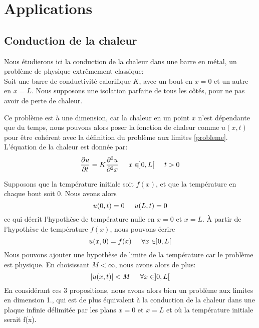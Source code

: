 \documentclass[12pt]{article}
\newcommand{\espace}{\hspace{5mm}}
\begin{document}
\section{Applications}

\subsection{Conduction de la chaleur}

Nous étudierons ici la conduction de la chaleur dans une barre en métal, un problème de physique extrêmement classique:\\
Soit une barre de conductivité calorifique $K$, avec un bout en $x = 0$ et un autre en $x = L$. Nous supposons une isolation parfaite de tous les côtés, pour ne pas avoir de perte de chaleur.

\begin{center}
\end{center}

Ce problème est à une dimension, car la chaleur en un point $x$ n'est dépendante que du temps, nous pouvons alors poser la fonction de chaleur comme $u(x,t)$ pour être cohérent avec la définition du problème aux limites \eqref{probleme}.
L'équation de la chaleur est donnée par:
\begin{equation} \label{equationChaleur}
\frac{\partial u}{\partial t} = K \frac{\partial^2 u}{\partial^2 x} \espace x \in]0,L[ \espace t>0
\end{equation}

Supposons que la température initiale soit $f(x)$, et que la température en chaque bout soit 0. Nous avons alors
\begin{equation} \label{temperaturesBouts}
u(0,t) = 0\espace u(L,t) = 0
\end{equation}
ce qui décrit l'hypothèse de température nulle en $x=0$ et $x=L$.  À partir de l'hypothèse de température $f(x)$, nous pouvons écrire
\begin{equation}
u(x,0) = f(x) \espace \forall x \in ]0,L[
\end{equation}
Nous pouvons ajouter une hypothèse de limite de la température car le problème est physique. En choisissant $M < \infty$, nous avons alors de plus:
\begin{equation}
|u(x,t)| < M \espace \forall x \in ]0,L[
\end{equation}
En considérant ces 3 propositions, nous avons alors bien un problème aux limites en dimension 1., qui est de plus équivalent à la conduction de la chaleur dans une plaque infinie délimitée par les plans $x=0$ et $x=L$ et où la température initiale serait f(x).
\end{document}

